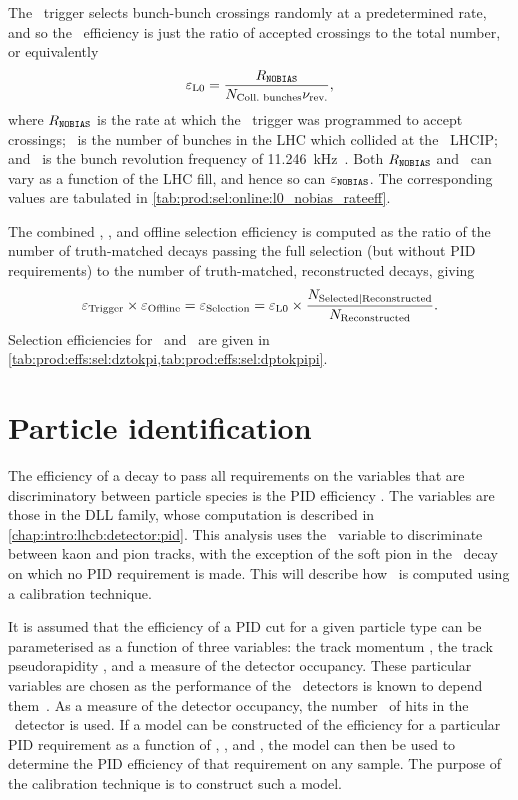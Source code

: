 The \lzero\ trigger selects bunch-bunch crossings randomly at a predetermined 
rate, and so the \lzero\ efficiency is just the ratio of accepted crossings to 
the total number, or equivalently
\begin{equation}
  \efflzero = \frac{%
    R_{\nobias}
  }{%
    \ncollbunches\revfreq
  },
  \label{eqn:prod:effs:sel:l0}
\end{equation}
where $R_{\texttt{NOBIAS}}$ is the rate at which the \lzero\ trigger was programmed to 
accept crossings; \ncollbunches\ is the number of bunches in the \ac{LHC} which 
collided at the \lhcb\ \acl{LHCIP}; and \revfreq\ is the bunch revolution 
frequency of \SI{11.246}{\kilo\hertz}~\cite{Bruning:2004ej}.
Both $R_{\texttt{NOBIAS}}$ and \ncollbunches\ can vary as a function of the \ac{LHC} 
fill, and hence so can $\varepsilon_{\texttt{NOBIAS}}$.
The corresponding values are tabulated in 
\cref{tab:prod:sel:online:l0_nobias_rateeff}.

The combined \hltone, \hlttwo, and offline selection efficiency is computed as 
the ratio of the number of truth-matched decays passing the full selection (but 
without \ac{PID} requirements) to the number of truth-matched, reconstructed 
decays, giving
\begin{equation}
  \efftrig \times \effoffline = \effselection = \efflzero \times \frac{%
    N_{\text{Selected}|\text{Reconstructed}}
  }{%
    N_{\text{Reconstructed}}
  }.
  \label{eqn:prod:effs:sel}
\end{equation}
Selection efficiencies for \DzToKpi\ and \DpToKpipi\ are given in 
\cref{tab:prod:effs:sel:dztokpi,tab:prod:effs:sel:dptokpipi}.

\section{Particle identification}
\label{chap:prod:effs:pid}

The efficiency of a decay to pass all requirements on the variables that are 
discriminatory between particle species is the \ac{PID} efficiency \effpid.
The variables are those in the \acf{DLL} family, whose computation is described 
in \cref{chap:intro:lhcb:detector:pid}.
This analysis uses the \dllkpi\ variable to discriminate between kaon and pion 
tracks, with the exception of the soft pion in the \DstToDzpi\ decay on which 
no \ac{PID} requirement is made.
This  will describe how \effpid\ is computed using 
a calibration technique.

It is assumed that the efficiency of a \ac{PID} cut for a given particle type 
can be parameterised as a function of three variables: the track momentum 
\ptot, the track pseudorapidity \Eta, and a measure of the detector occupancy.
These particular variables are chosen as the performance of the \rich\ 
detectors is known to depend them~\cite{Adinolfi:2012qfa}.
As a measure of the detector occupancy, the number \nspd\ of hits in the \spd\ 
detector is used.
If a model can be constructed of the efficiency for a particular \ac{PID} 
requirement as a function of \ptot, \Eta, and \nspd, the model can then be used 
to determine the \ac{PID} efficiency of that requirement on any sample.
The purpose of the calibration technique is to construct such a model.

